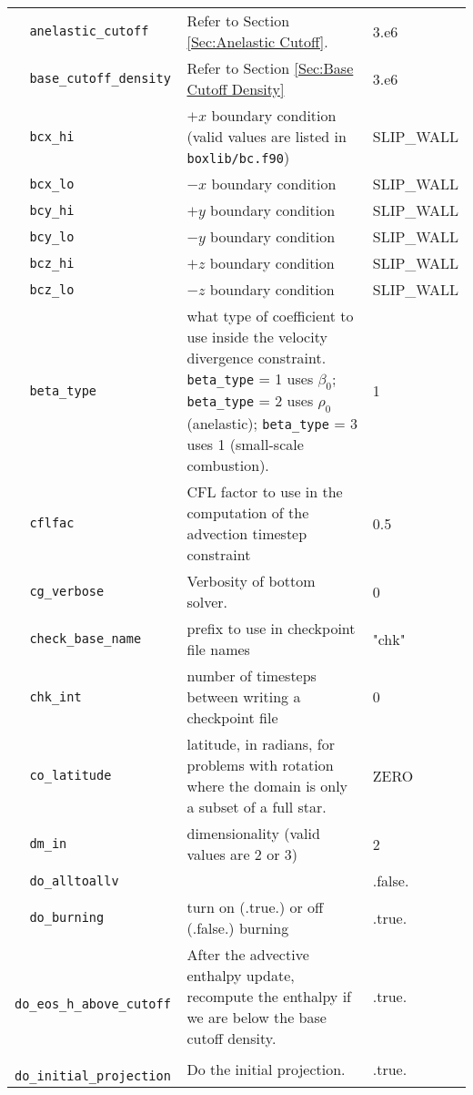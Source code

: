 {\begin{center}
\begin{longtable}{|l|p{3.25in}|l|}
\verb=  anelastic_cutoff =  & Refer to Section \ref{Sec:Anelastic Cutoff}.  &  3.e6 \\
\verb=  base_cutoff_density =  & Refer to Section \ref{Sec:Base Cutoff Density}  &  3.e6 \\
\verb=  bcx_hi =  & $+x$ boundary condition (valid values are listed in {\tt  boxlib/bc.f90})  &  SLIP\_WALL \\
\verb=  bcx_lo =  & $-x$ boundary condition  &  SLIP\_WALL \\
\verb=  bcy_hi =  & $+y$ boundary condition  &  SLIP\_WALL \\
\verb=  bcy_lo =  & $-y$ boundary condition  &  SLIP\_WALL \\
\verb=  bcz_hi =  & $+z$ boundary condition  &  SLIP\_WALL \\
\verb=  bcz_lo =  & $-z$ boundary condition  &  SLIP\_WALL \\
\verb=  beta_type =  & what type of coefficient to use inside the velocity divergence constraint.  
                           {\tt beta\_type} = 1 uses $\beta_0$; {\tt beta\_type} = 2 uses $\rho_0$ (anelastic);
                           {\tt beta\_type} = 3 uses 1 (small-scale combustion).  &  1 \\
\verb=  cflfac =  & CFL factor to use in the computation of the advection timestep constraint  &  0.5 \\
\verb=  cg_verbose =  & Verbosity of bottom solver.  &  0 \\
\verb=  check_base_name =  & prefix to use in checkpoint file names  &  "chk" \\
\verb=  chk_int =  & number of timesteps between writing a checkpoint file  & 0 \\
\verb=  co_latitude =  & latitude, in radians, for problems with rotation where the domain is only a subset
                             of a full star.  &  ZERO \\
\verb=  dm_in =  & dimensionality (valid values are 2 or 3)  &  2 \\
\verb=  do_alltoallv =  &   &  .false. \\
\verb=  do_burning =  & turn on (.true.) or off (.false.) burning  &  .true. \\
\verb=  do_eos_h_above_cutoff =  & After the advective enthalpy update, recompute the enthalpy if we are 
                                         below the base cutoff density.   &  .true. \\
\verb=  do_initial_projection =  & Do the initial projection.  & .true. \\

\end{longtable}
\end{center}}
